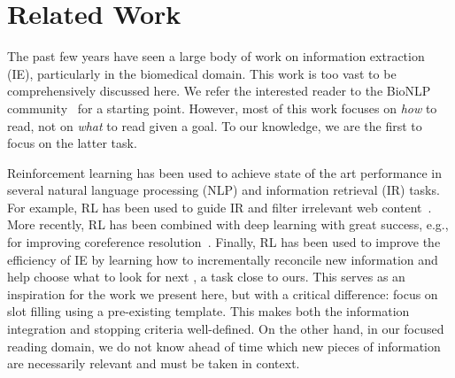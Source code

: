 \section{Related Work}\label{sec:related}


The past few years have seen a large body of work on information extraction (IE), particularly in the biomedical domain. 
This work is too vast to be comprehensively discussed here. We refer the interested reader to the BioNLP community~\cite[inter alia]{nedellec2013overview,kim2012genia,kim2009overview} for a starting point. 
However, most of this work focuses on {\em how} to read, not on {\em what} to read given a goal. To our knowledge, we are the first to focus on the latter task.

Reinforcement learning has been used to achieve state of the art performance in several natural language processing (NLP) and information retrieval (IR) tasks.
For example, RL has been used to guide IR and filter irrelevant web content~\cite{seo2000reinforcement, zhang2001personalized}.
More recently, RL has been combined with deep learning with great success, e.g., for improving coreference resolution~\cite{clark2016deep}. 
Finally, RL has been used to improve the efficiency of IE by learning how to incrementally reconcile new information and help choose what to look for next \cite{narasimhan2016improving}, a task close to ours.
This serves as an inspiration for the work we present here, but with a critical difference: \citet{narasimhan2016improving} focus on slot filling using a pre-existing template. This makes both the information integration and stopping criteria well-defined. On the other hand, in our focused reading domain, we do not know ahead of time which new pieces of information are necessarily relevant and must be taken in context.